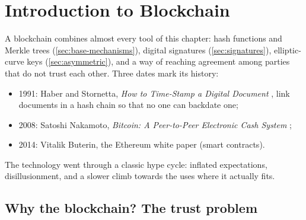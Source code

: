 \section{Introduction to Blockchain}
\label{sec:blockchain}

A blockchain combines almost every tool of this chapter: hash functions and Merkle trees (\cref{sec:base-mechanisms}), digital signatures (\cref{sec:signatures}), elliptic-curve keys (\cref{sec:asymmetric}), and a way of reaching agreement among parties that do not trust each other. Three dates mark its history:
\begin{itemize}
    \item 1991: Haber and Stornetta, \emph{How to Time-Stamp a Digital Document} \cite{haber1991}, link documents in a hash chain so that no one can backdate one;
    \item 2008: Satoshi Nakamoto, \emph{Bitcoin: A Peer-to-Peer Electronic Cash System} \cite{nakamoto2008};
    \item 2014: Vitalik Buterin, the Ethereum white paper (smart contracts).
\end{itemize}
The technology went through a classic hype cycle: inflated expectations, disillusionment, and a slower climb towards the uses where it actually fits.


\subsection{Why the blockchain? The trust problem}

